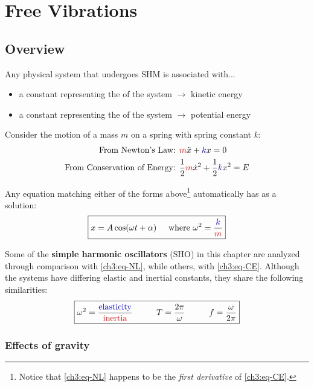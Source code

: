 \chapter{Free Vibrations} \label{ch:free-vibrations}

\section{Overview} \label{ch3:sec-simple-springs}
Any physical system that undergoes SHM is associated with...
\begin{itemize}
	\item a constant representing the  of the system $\longrightarrow$ kinetic energy
	\item a constant representing the  of the system $\longrightarrow$ potential energy
\end{itemize}

Consider the motion of a mass $m$ on a spring with spring constant $k$:
\begin{align}
	\text{From Newton's Law: }&
	\textcolor{red}{m}\ddot{x} + \textcolor{blue}{k}x = 0 \label{ch3:eq-NL} \\
	\text{From Conservation of Energy: }&
	\frac{1}{2}\textcolor{red}{m}\dot{x}^2 + \frac{1}{2}\textcolor{blue}{k}x^2 = E \label{ch3:eq-CE}
\end{align}

Any equation matching either of the forms above\footnote{Notice that \eqref{ch3:eq-NL} happens to be the \textit{first derivative} of  \eqref{ch3:eq-CE}.} automatically has as a solution:
\begin{equation}
\boxed{x = A \cos(\omega t+\alpha)\hspace{0.5cm}\text{where }\omega^2 = \frac{\textcolor{blue}{k}}{\textcolor{red}{m}}} \label{ch3:eq-SHM-soln}
\end{equation}

Some of the \textbf{simple harmonic oscillators} (SHO) in this chapter are analyzed through comparison with \eqref{ch3:eq-NL}, while others, with \eqref{ch3:eq-CE}. Although the systems have differing elastic and inertial constants, they share the following similarities:
\begin{equation}
	\boxed{
		\omega^2 = \frac{\kcol{\text{elasticity}}}{\mcol{\text{inertia}}} \hhtab 
		T = \frac{2\pi}{\omega} \hhtab 
		f = \frac{\omega}{2\pi}}
\end{equation}

\subsection{Effects of gravity}

